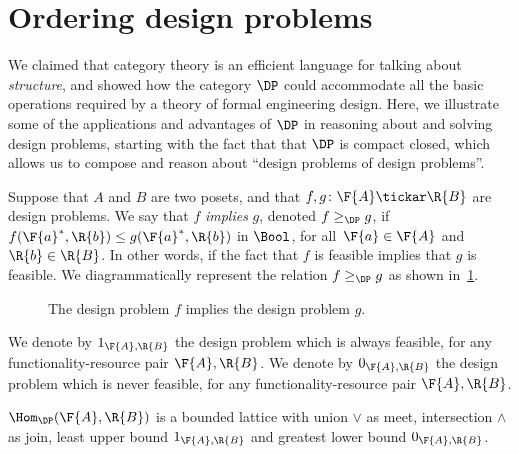 \section{Ordering design problems}

We claimed that category theory is an efficient language for talking about \emph{structure}, and showed how the category $\DP$ could accommodate all the basic operations required by a theory of formal engineering design. Here, we illustrate some of the applications and advantages of $\DP$ in reasoning about and solving design problems, starting with the fact that that $\DP$ is compact closed, which allows us to compose and reason about ``design problems of design problems''.

\begin{definition}[Order on $\DP$]
\label{def:DP_loc_pos}

Suppose that $A$ and $B$ are two posets, and that $f,g \colon \F{A} \tickar \R{B}$ are design problems. We say that $f$ \emph{implies} $g$, denoted $f \geq_{\DP} g$, if $f(\F{a}^*,\R{b}) \leq g(\F{a}^*,\R{b} )$ in $\Bool$, for all~$\F{a} \in \F{A}$
and~$\R{b} \in \R{B}$. In other words, if the fact that $f$ is feasible implies that $g$ is feasible. We diagrammatically represent the relation $f \geq_{\DP} g$ as shown in~\cref{fig:dpimplies}.

\begin{figure}[h!]
\begin{center}
\end{center}
\caption{The design problem $f$ implies the design problem $g$. \label{fig:dpimplies}}
\end{figure}
\end{definition}

\begin{remark}
We denote by $1_{\F{A},\R{B}}$ the design problem which is always feasible, for any functionality-resource pair $\F{A},\R{B}$. We denote by $0_{\F{A},\R{B}}$ the design problem which is never feasible, for any functionality-resource pair $\F{A},\R{B}$.
\end{remark}
\begin{lemma}
\label{lemma:dpboundedlattice}
$\Hom_\DP(\F{A},\R{B})$ is a bounded lattice with union $\vee$ as meet, intersection $\wedge$ as join, least upper bound  $1_{\F{A},\R{B}}$ and greatest lower bound $0_{\F{A},\R{B}}$.
\end{lemma}

